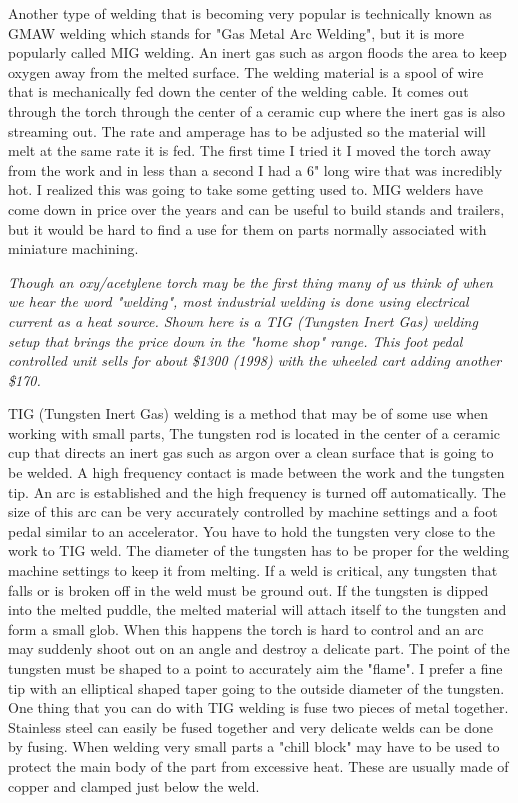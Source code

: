 Another type of welding that is becoming very popular is technically known as
GMAW welding which stands for "Gas Metal Arc Welding", but it is more popularly
called MIG welding. An inert gas such as argon floods the area to keep oxygen
away from the melted surface. The welding material is a spool of wire that is
mechanically fed down the center of the welding cable. It comes out through the
torch through the center of a ceramic cup where the inert gas is also streaming
out. The rate and amperage has to be adjusted so the material will melt at the
same rate it is fed. The first time I tried it I moved the torch away from the
work and in less than a second I had a 6" long wire that was incredibly hot. I
realized this was going to take some getting used to. MIG welders have come down
in price over the years and can be useful to build stands and trailers, but it
would be hard to find a use for them on parts normally associated with miniature
machining.

\bigskip
\textit{Though an oxy/acetylene torch may be the first thing many of us think of
when we hear the word "welding", most industrial welding is done using
electrical current as a heat source. Shown here is a TIG (Tungsten Inert Gas)
welding setup that brings the price down in the "home shop" range. This foot
pedal controlled unit sells for about \$1300 (1998) with the wheeled cart adding
another \$170.}
\bigskip


TIG (Tungsten Inert Gas) welding is a method that may be of some use when
working with small parts, The tungsten rod is located in the center of a ceramic
cup that directs an inert gas such as argon over a clean surface that is going
to be welded. A high frequency contact is made between the work and the tungsten
tip. An arc is established and the high frequency is turned off automatically.
The size of this arc can be very accurately controlled by machine settings and a
foot pedal similar to an accelerator. You have to hold the tungsten very close
to the work to TIG weld. The diameter of the tungsten has to be proper for the
welding machine settings to keep it from melting. If a weld is critical, any
tungsten that falls or is broken off in the weld must be ground out. If the
tungsten is dipped into the melted puddle, the melted material will attach
itself to the tungsten and form a small glob. When this happens the torch is
hard to control and an arc may suddenly shoot out on an angle and destroy a
delicate part. The point of the tungsten must be shaped to a point to accurately
aim the "flame". I prefer a fine tip with an elliptical shaped taper going to
the outside diameter of the tungsten. One thing that you can do with TIG welding
is fuse two pieces of metal together. Stainless steel can easily be fused
together and very delicate welds can be done by fusing. When welding very small
parts a "chill block" may have to be used to protect the main body of the part
from excessive heat. These are usually made of copper and clamped just below the
weld.

